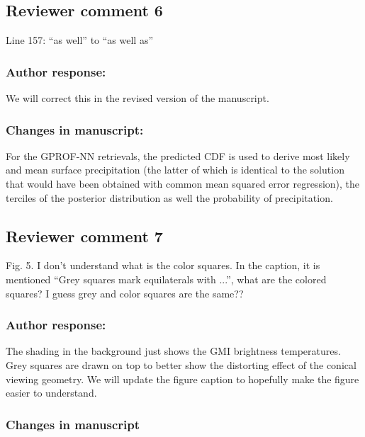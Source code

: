 \subsection*{Reviewer comment 6}

Line 157: “as well” to “as well as”



\subsubsection*{Author response:}

We will correct this in the revised version of the manuscript.

\subsubsection*{Changes in manuscript:}

\begin{change}[179]
For the GPROF-NN retrievals, the
predicted CDF is used to derive most likely and mean surface precipitation (the
latter of which is identical to the solution that would have been obtained with
common mean squared error regression), the terciles of the posterior
distribution as well \DIFaddbegin {}\DIFaddend the probability of precipitation.
\end{change}

\subsection*{Reviewer comment 7}

Fig. 5. I don’t understand what is the color squares. In the caption, it is mentioned “Grey
squares mark equilaterals with ...”, what are the colored squares? I guess grey and color
squares are the same??

\subsubsection*{Author response:}

The shading in the background just shows the GMI brightness temperatures. Grey
squares are drawn on top to better show the distorting effect of the conical
viewing geometry. We will update the figure caption to hopefully make the figure
easier to understand.

\subsubsection*{Changes in manuscript}

